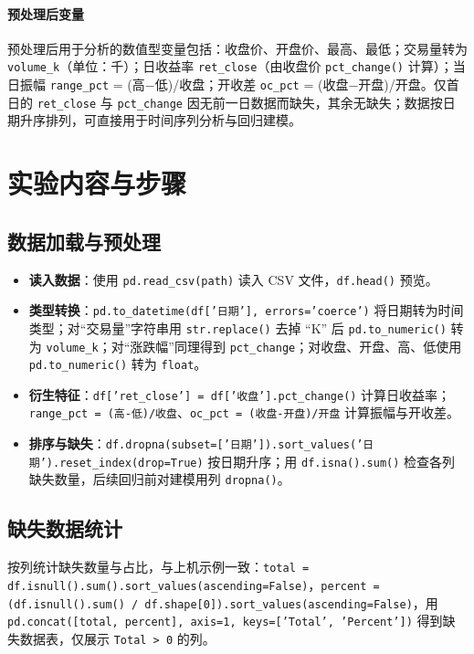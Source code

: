 \documentclass[12pt,a4paper]{article}
\begin{document}
\paragraph{预处理后变量} 预处理后用于分析的数值型变量包括：收盘价、开盘价、最高、最低；交易量转为 \texttt{volume\_k}（单位：千）；日收益率 \texttt{ret\_close}（由收盘价 \texttt{pct\_change()} 计算）；当日振幅 \texttt{range\_pct} = (高$-$低)/收盘；开收差 \texttt{oc\_pct} = (收盘$-$开盘)/开盘。仅首日的 \texttt{ret\_close} 与 \texttt{pct\_change} 因无前一日数据而缺失，其余无缺失；数据按日期升序排列，可直接用于时间序列分析与回归建模。

\section{实验内容与步骤}

\subsection{数据加载与预处理}
\begin{itemize}[leftmargin=*]
    \item \textbf{读入数据}：使用 \texttt{pd.read\_csv(path)} 读入 CSV 文件，\texttt{df.head()} 预览。
    \item \textbf{类型转换}：\texttt{pd.to\_datetime(df['日期'], errors='coerce')} 将日期转为时间类型；对“交易量”字符串用 \texttt{str.replace()} 去掉 ``K'' 后 \texttt{pd.to\_numeric()} 转为 \texttt{volume\_k}；对“涨跌幅”同理得到 \texttt{pct\_change}；对收盘、开盘、高、低使用 \texttt{pd.to\_numeric()} 转为 \texttt{float}。
    \item \textbf{衍生特征}：\texttt{df['ret\_close'] = df['收盘'].pct\_change()} 计算日收益率；\texttt{range\_pct = (高-低)/收盘}、\texttt{oc\_pct = (收盘-开盘)/开盘} 计算振幅与开收差。
    \item \textbf{排序与缺失}：\texttt{df.dropna(subset=['日期']).sort\_values('日期').reset\_index(drop=True)} 按日期升序；用 \texttt{df.isna().sum()} 检查各列缺失数量，后续回归前对建模用列 \texttt{dropna()}。
\end{itemize}

\subsection{缺失数据统计}
按列统计缺失数量与占比，与上机示例一致：\texttt{total = df.isnull().sum().sort\_values(ascending=False)}，\texttt{percent = (df.isnull().sum() / df.shape[0]).sort\_values(ascending=False)}，用 \texttt{pd.concat([total, percent], axis=1, keys=['Total', 'Percent'])} 得到缺失数据表，仅展示 \texttt{Total > 0} 的列。
\end{document}
